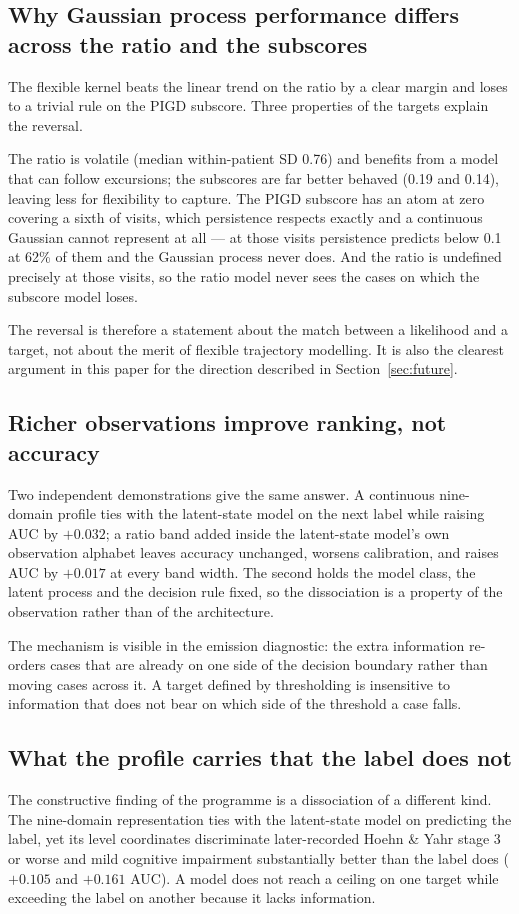 \documentclass[11pt]{article}
\begin{document}
\subsection{Why Gaussian process performance differs across the ratio and the
subscores}
The flexible kernel beats the linear trend on the ratio by a clear margin and
loses to a trivial rule on the PIGD subscore. Three properties of the targets
explain the reversal.

The ratio is volatile (median within-patient SD 0.76) and benefits from a model
that can follow excursions; the subscores are far better behaved (0.19 and 0.14),
leaving less for flexibility to capture. The PIGD subscore has an atom at zero
covering a sixth of visits, which persistence respects exactly and a continuous
Gaussian cannot represent at all --- at those visits persistence predicts below
0.1 at 62\% of them and the Gaussian process never does. And the ratio is
undefined precisely at those visits, so the ratio model never sees the cases on
which the subscore model loses.

The reversal is therefore a statement about the match between a likelihood and a
target, not about the merit of flexible trajectory modelling. It is also the
clearest argument in this paper for the direction described in
Section~\ref{sec:future}.

\subsection{Richer observations improve ranking, not accuracy}
Two independent demonstrations give the same answer. A continuous nine-domain
profile ties with the latent-state model on the next label while raising AUC by
$+0.032$; a ratio band added inside the latent-state model's own observation
alphabet leaves accuracy unchanged, worsens calibration, and raises AUC by
$+0.017$ at every band width. The second holds the model class, the latent
process and the decision rule fixed, so the dissociation is a property of the
observation rather than of the architecture.

The mechanism is visible in the emission diagnostic: the extra information
re-orders cases that are already on one side of the decision boundary rather than
moving cases across it. A target defined by thresholding is insensitive to
information that does not bear on which side of the threshold a case falls.

\subsection{What the profile carries that the label does not}
The constructive finding of the programme is a dissociation of a different kind.
The nine-domain representation ties with the latent-state model on predicting the
label, yet its level coordinates discriminate later-recorded Hoehn \& Yahr stage
3 or worse and mild cognitive impairment substantially better than the label does
($+0.105$ and $+0.161$ AUC). A model does not reach a ceiling on one target while
exceeding the label on another because it lacks information.
\end{document}

